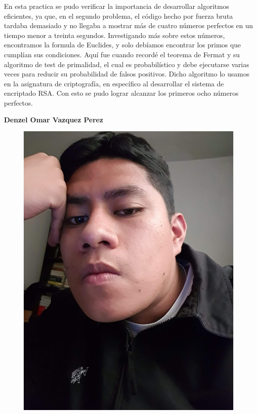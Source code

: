 \documentclass[12pt,twoside]{article}
\begin{document}
En esta practica se pudo verificar la importancia de desarrollar algoritmos eficientes, ya que, en el segundo problema, el código hecho por fuerza bruta tardaba demasiado y no llegaba a mostrar más de cuatro números perfectos en un tiempo menor a treinta segundos. Investigando más sobre estos números, encontramos la formula de Euclides, y solo debíamos encontrar los primos que cumplían sus condiciones. Aquí fue cuando recordé el teorema de Fermat y su algoritmo de test de primalidad, el cual es probabilístico y debe ejecutarse varias veces para reducir su probabilidad de falsos positivos. Dicho algoritmo lo usamos en la asignatura de criptografía, en específico al desarrollar el sistema de encriptado RSA. Con esto se pudo lograr alcanzar los primeros ocho números perfectos.

\textbf{\large Denzel Omar Vazquez Perez}
\begin{figure}[H]
    \centering
    \includegraphics[angle=-90, scale= 0.05]{imagenes/foto2.jpg}
\end{figure}
\end{document}
